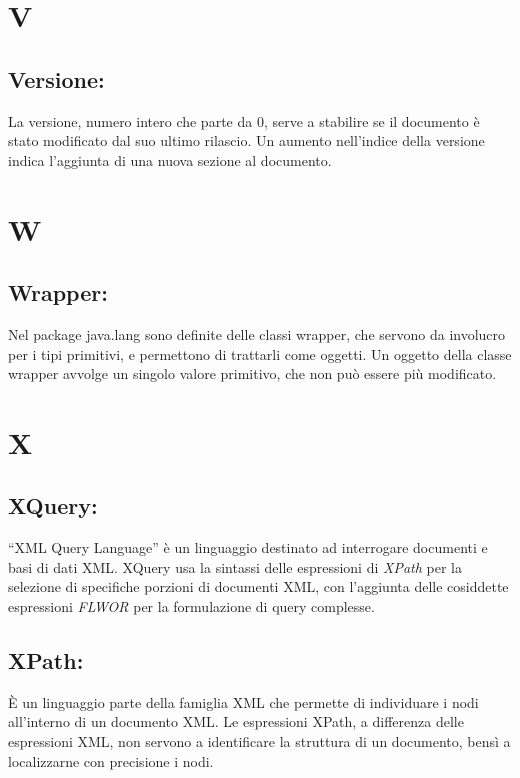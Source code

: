 \chapter{V}
\section{Versione:}
La versione, numero intero che parte da 0, serve a stabilire se il documento \`e stato modificato dal suo ultimo rilascio. Un aumento nell'indice della versione indica l'aggiunta di una nuova sezione al documento.

\chapter{W}
\section{Wrapper:}
Nel package java.lang sono definite delle classi wrapper, che servono da involucro per i tipi primitivi, e permettono di trattarli come oggetti. Un oggetto della classe wrapper avvolge un singolo valore primitivo, che non pu\`o essere pi\`u modificato.

\chapter{X}
\section{XQuery:}
``XML Query Language'' \`e un linguaggio destinato ad interrogare documenti e basi di dati XML.
XQuery usa la sintassi delle espressioni di \textit{XPath} per la selezione di specifiche porzioni di documenti XML, con l'aggiunta delle cosiddette espressioni \textit{FLWOR} per la formulazione di query complesse.
\section{XPath:}
\`E un linguaggio parte della famiglia XML che permette di individuare i nodi all'interno di un documento XML. Le espressioni XPath, a differenza delle espressioni XML, non servono a identificare la struttura di un documento, bens\`i a localizzarne con precisione i nodi.




